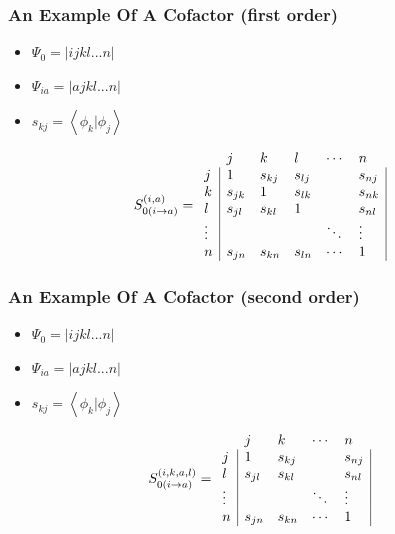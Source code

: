 \documentclass[]{beamer}
\begin{document}
\begin{frame}
  \frametitle{An Example Of A Cofactor (first order)}
  \begin{itemize}
    \item $\Psi_0 = |ijkl...n|$
    \item $\Psi_{ia} = |ajkl...n|$
    \item $s_{kj} = \left< \phi_k | \phi_j \right>$
  \end{itemize}
  \begin{equation*}
S_{0(i \rightarrow a)}^{(i,a)}=
\begin{array}{llllll}
 & j & k & l & \cdots & n \\
 j & \multicolumn{1}{|l}{1} & s_{kj} & s_{lj} & & \multicolumn{1}{l|}{s_{nj}} \\
 k & \multicolumn{1}{|l}{s_{jk}} & 1 & s_{lk} & & \multicolumn{1}{l|}{s_{nk}} \\
 l & \multicolumn{1}{|l}{s_{jl}} & s_{kl} & 1 & & \multicolumn{1}{l|}{s_{nl}} \\
 \vdots & \multicolumn{1}{|l}{ } &   & & \ddots & \multicolumn{1}{l|}{\vdots} \\
 n & \multicolumn{1}{|l}{ s_{jn}} & s_{kn} & s_{ln} & \cdots & \multicolumn{1}{l|}{1}
\end{array}
  \end{equation*}
\end{frame}

\begin{frame}
  \frametitle{An Example Of A Cofactor (second order)}
  \begin{itemize}
    \item $\Psi_0 = |ijkl...n|$
    \item $\Psi_{ia} = |ajkl...n|$
    \item $s_{kj} = \left< \phi_k | \phi_j \right>$
  \end{itemize}
  \begin{equation*}
S_{0(i \rightarrow a)}^{(i,k,a,l)}=
\begin{array}{lllll}
 & j & k & \cdots & n \\
 j & \multicolumn{1}{|l}{1} & s_{kj} & & \multicolumn{1}{l|}{s_{nj}} \\
 l & \multicolumn{1}{|l}{s_{jl}} & s_{kl} & & \multicolumn{1}{l|}{s_{nl}} \\
 \vdots & \multicolumn{1}{|l}{ } & & \ddots & \multicolumn{1}{l|}{\vdots} \\
 n & \multicolumn{1}{|l}{ s_{jn}} & s_{kn} & \cdots & \multicolumn{1}{l|}{1}
\end{array}
  \end{equation*}
\end{frame}
\end{document}
